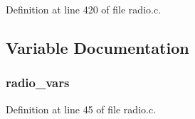 Definition at line 420 of file radio.\+c.



\subsection{Variable Documentation}
\subsubsection[{\texorpdfstring{radio\+\_\+vars}{radio_vars}}]{ radio\+\_\+vars}\hypertarget{boards_2_open_mote-_c_c2538_2radio_8c_a9c243c87287c9b1043c251aae61fd656}{}\label{boards_2_open_mote-_c_c2538_2radio_8c_a9c243c87287c9b1043c251aae61fd656}


Definition at line 45 of file radio.\+c.

